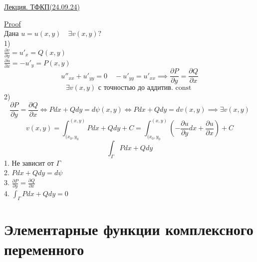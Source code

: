 \documentclass[a4paper]{article}
\begin{document}
    \begin{center}
        \underline{Лекция. ТФКП(24.09.24)}
    \end{center}
    \begin{tcolorbox}
        \underline{Proof} \\
        Дана $  u= u(x,y) \quad \exists v(x,y) ? $  \\
        1)\\
        $ \frac{\partial v}{\partial y} =  u'_x = Q(x,y)  $ \\
        $ \frac{\partial u}{\partial x} = -u'_y = P(x,y)$ 
        \[
            u''_{xx} + u'_{yy} =0 \quad -u'_{yy} = u'_{xx} \implies
            \frac{\partial P}{\partial y} = \frac{\partial Q}{\partial x} 
        \]
        \[
            \exists v(x,y) \text{ с точностью до аддитив. const }
        \]
        2)\[
            \frac{\partial P}{\partial y} = \frac{\partial Q}{\partial x} 
            \iff Pdx + Qdy = d\psi(x,y) \iff Pdx + Qdy = dv(x,y) \implies \exists
            v(x,y)
        \]
        \[
            v(x,y) = \int_{(x_0, y_0}^{(x,y)} Pdx + Qdy + C = 
            \int_{(x_0, y_0}^{(x,y)} ( - \frac{\partial u}{\partial y} dx
             + \frac{\partial u}{\partial x}) + C
        \]
        \[
            \int_{\Gamma} Pdx + Qdy
        \]
        1. Не зависит от $ \Gamma $  \\
        2. $ Pdx + Qdy = d\psi $  \\
        3. $ \frac{\partial P}{\partial y} = \frac{\partial Q}{\partial x}  $ \\
        4. $\int_{\Gamma} Pdx + Q dy = 0$ \\
    \end{tcolorbox}
    \section*{\centering Элементарные функции комплексного переменного}
\end{document}
